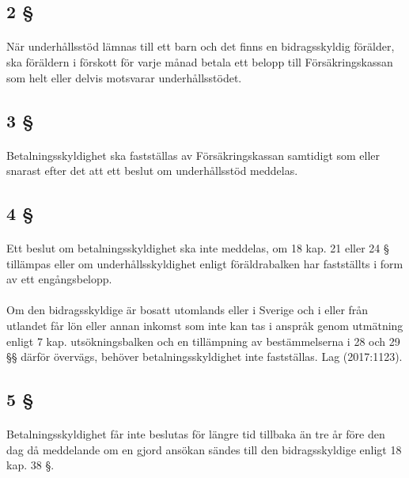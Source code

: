 \documentclass[a4paper,notitlepage,openany,10pt]{book}
\begin{document}
\subsection*{2 §}
\paragraph*{}
När underhållsstöd lämnas till ett barn och det finns en bidragsskyldig förälder, ska föräldern i förskott för varje månad betala ett belopp till Försäkringskassan som helt eller delvis motsvarar underhållsstödet.
\subsection*{3 §}
\paragraph*{}
Betalningsskyldighet ska fastställas av Försäkringskassan samtidigt som eller snarast efter det att ett beslut om underhållsstöd meddelas.
\subsection*{4 §}
\paragraph*{}
Ett beslut om betalningsskyldighet ska inte meddelas, om 18 kap. 21 eller 24 § tillämpas eller om underhållsskyldighet enligt föräldrabalken har fastställts i form av ett engångsbelopp.
\paragraph*{}
Om den bidragsskyldige är bosatt utomlands eller i Sverige och i eller från utlandet får lön eller annan inkomst som inte kan tas i anspråk genom utmätning enligt 7 kap. utsökningsbalken och en tillämpning av bestämmelserna i 28 och 29 §§ därför övervägs, behöver betalningsskyldighet inte fastställas.
Lag (2017:1123).
\subsection*{5 §}
\paragraph*{}
Betalningsskyldighet får inte beslutas för längre tid tillbaka än tre år före den dag då meddelande om en gjord ansökan sändes till den bidragsskyldige enligt 18 kap. 38 §.
\end{document}
